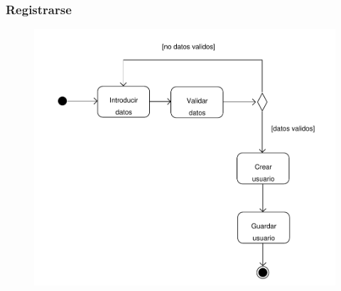 \documentclass[11pt, a4paper, twoside, titlepage]{article}
\begin{document}
			\subsubsection{Registrarse}
				\begin{figure}[H]\centering
					\includegraphics[scale=.8]{diagramas/da_registrarse.pdf}
				\end{figure}
\end{document}
